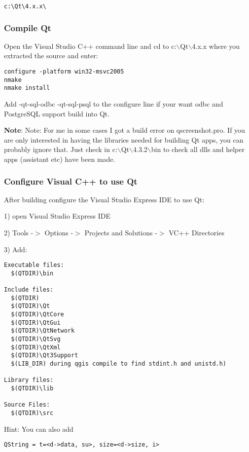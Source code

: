 \begin{verbatim}
c:\Qt\4.x.x\
\end{verbatim}

\subsubsection{Compile Qt}
Open the Visual Studio C++ command line and cd to c:$\backslash$Qt$\backslash$4.x.x where you
extracted the source and enter:

\begin{verbatim}
configure -platform win32-msvc2005
nmake
nmake install
\end{verbatim}

Add -qt-sql-odbc -qt-sql-psql to the configure line if your want odbc and
PostgreSQL support build into Qt.

\textbf{Note}:   Note: For me in some cases I got a build error on qscreenshot.pro. If you
are only interested in having the libraries needed for building Qt apps, you 
can probably ignore that. Just check in c:$\backslash$Qt$\backslash$4.3.2$\backslash$bin to check all dlls and 
helper apps (assistant etc) have been made.

\subsubsection{Configure Visual C++ to use Qt}
After building configure the Visual Studio Express IDE to use Qt:

1) open Visual Studio Express IDE

2) Tools -$>$ Options -$>$ Projects and Solutions -$>$ VC++ Directories

3) Add:

\begin{verbatim}
Executable files: 
  $(QTDIR)\bin

Include files: 
  $(QTDIR)
  $(QTDIR)\Qt
  $(QTDIR)\QtCore
  $(QTDIR)\QtGui
  $(QTDIR)\QtNetwork
  $(QTDIR)\QtSvg
  $(QTDIR)\QtXml
  $(QTDIR)\Qt3Support
  $(LIB_DIR) during qgis compile to find stdint.h and unistd.h)

Library files: 
  $(QTDIR)\lib

Source Files:
  $(QTDIR)\src
\end{verbatim}

Hint:  You can also add

\begin{verbatim}
QString = t=<d->data, su>, size=<d->size, i>
\end{verbatim}

